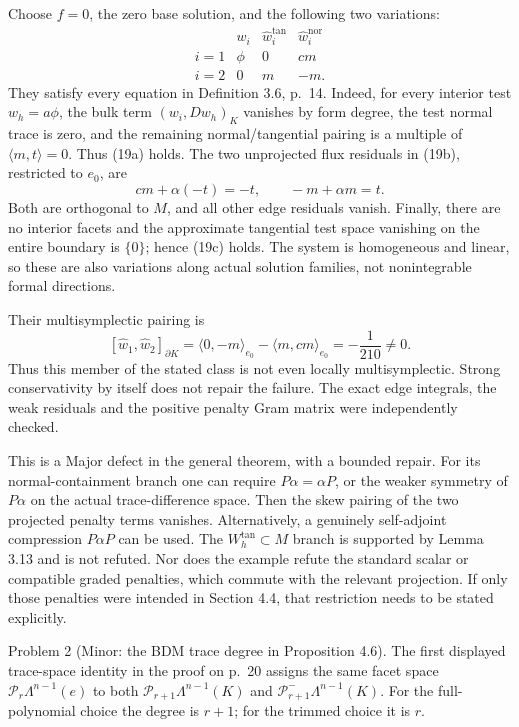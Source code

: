 \documentclass[10pt]{article}
\begin{document}
Choose \(f=0\), the zero base solution, and the following two variations: \[\begin{array}{c|ccc}
 &w_i&\widehat w_i^\mathrm{tan}&\widehat w_i^\mathrm{nor}\\ \hline
 i=1&\phi&0&cm\\
 i=2&0&m&-m .
\end{array}\] They satisfy every equation in Definition 3.6, p. 14. Indeed, for every interior test \(w_h=a\phi\), the bulk term \((w_i,Dw_h)_K\) vanishes by form degree, the test normal trace is zero, and the remaining normal/tangential pairing is a multiple of \(\langle m,t\rangle=0\). Thus (19a) holds. The two unprojected flux residuals in (19b), restricted to \(e_0\), are \[cm+\alpha(-t)=-t,\qquad -m+\alpha m=t.\] Both are orthogonal to \(M\), and all other edge residuals vanish. Finally, there are no interior facets and the approximate tangential test space vanishing on the entire boundary is \(\{0\}\); hence (19c) holds. The system is homogeneous and linear, so these are also variations along actual solution families, not nonintegrable formal directions.\par
Their multisymplectic pairing is \[[\widehat w_1,\widehat w_2]_{\partial K}
 =\langle 0,-m\rangle_{e_0}-\langle m,cm\rangle_{e_0}
 =-\frac1{210}\neq0.\] Thus this member of the stated class is not even locally multisymplectic. Strong conservativity by itself does not repair the failure. The exact edge integrals, the weak residuals and the positive penalty Gram matrix were independently checked.\par
This is a Major defect in the general theorem, with a bounded repair. For its normal-containment branch one can require \(P\alpha=\alpha P\), or the weaker symmetry of \(P\alpha\) on the actual trace-difference space. Then the skew pairing of the two projected penalty terms vanishes. Alternatively, a genuinely self-adjoint compression \(P\alpha P\) can be used. The \(W_h^\mathrm{tan}\subset M\) branch is supported by Lemma 3.13 and is not refuted. Nor does the example refute the standard scalar or compatible graded penalties, which commute with the relevant projection. If only those penalties were intended in Section 4.4, that restriction needs to be stated explicitly.\par
Problem 2 (Minor: the BDM trace degree in Proposition 4.6).  The first displayed trace-space identity in the proof on p. 20 assigns the same facet space \(\mathcal P_r\Lambda^{n-1}(e)\) to both \(\mathcal P_{r+1}\Lambda^{n-1}(K)\) and \(\mathcal P_{r+1}^{-}\Lambda^{n-1}(K)\). For the full-polynomial choice the degree is \(r+1\); for the trimmed choice it is \(r\).\par
\end{document}
